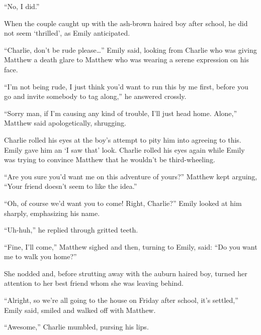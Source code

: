 “No, I did.”

When the couple caught up with the ash-brown haired boy after school, he did not seem ‘thrilled’, as Emily anticipated.

“Charlie, don’t be rude please…” Emily said, looking from Charlie who was giving Matthew a death glare to Matthew who was wearing a serene expression on his face.

“I’m not being rude, I just think you’d want to run this by me first, before you go and invite somebody to tag along,” he answered crossly.

“Sorry man, if I’m causing any kind of trouble, I’ll just head home. Alone,” Matthew said apologetically, shrugging.

Charlie rolled his eyes at the boy’s attempt to pity him into agreeing to this. Emily gave him an ‘I saw that’ look. Charlie rolled his eyes again while Emily was trying to convince Matthew that he wouldn’t be third-wheeling.

“Are you sure you’d want me on this adventure of yours?” Matthew kept arguing, “Your friend doesn’t seem to like the idea.”

“Oh, of course we’d want you to come! Right, Charlie?” Emily looked at him sharply, emphasizing his name.

“Uh-huh,” he replied through gritted teeth.

“Fine, I’ll come,” Matthew sighed and then, turning to Emily, said: “Do you want me to walk you home?”

She nodded and, before strutting away with the auburn haired boy, turned her attention to her best friend whom she was leaving behind.

“Alright, so we’re all going to the house on Friday after school, it’s settled,” Emily said, smiled and walked off with Matthew.

“Awesome,” Charlie mumbled, pursing his lips.